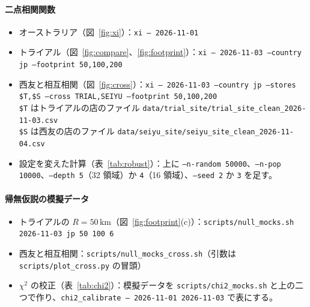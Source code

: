 \documentclass[a4paper,11pt]{ltjsarticle}
\newcommand{\code}[1]{\textcolor{codecolor}{\texttt{#1}}}
\begin{document}
\paragraph{二点相関関数}
\begin{itemize}
  \item オーストラリア（図~\ref{fig:xi}）：\code{xi -- 2026-11-01}
  \item トライアル（図~\ref{fig:compare}、\ref{fig:footprint}）：\code{xi -- 2026-11-03 --country jp --footprint 50,100,200}
  \item 西友と相互相関（図~\ref{fig:cross}）：\code{xi -- 2026-11-03 --country jp --stores \$T,\$S --cross TRIAL,SEIYU --footprint 50,100,200}\\
    \code{\$T} はトライアルの店のファイル \code{data/trial\_site/trial\_site\_clean\_2026-11-03.csv}\\
    \code{\$S} は西友の店のファイル \code{data/seiyu\_site/seiyu\_site\_clean\_2026-11-04.csv}
  \item 設定を変えた計算（表~\ref{tab:robust}）：上に \code{--n-random 50000}、\code{--n-pop 10000}、\code{--depth 5}（32 領域）か \code{4}（16 領域）、\code{--seed 2} か \code{3} を足す。
\end{itemize}

\paragraph{帰無仮説の模擬データ}
\begin{itemize}
  \item トライアルの $R = 50\,\mathrm{km}$（図~\ref{fig:footprint}(c)）：\code{scripts/null\_mocks.sh 2026-11-03 jp 50 100 6}
  \item 西友と相互相関：\code{scripts/null\_mocks\_cross.sh}（引数は \code{scripts/plot\_cross.py} の冒頭）
  \item $\chi^2$ の校正（表~\ref{tab:chi2}）：模擬データを \code{scripts/chi2\_mocks.sh} と上の二つで作り、\code{chi2\_calibrate -- 2026-11-01 2026-11-03} で表にする。
\end{itemize}
\end{document}

